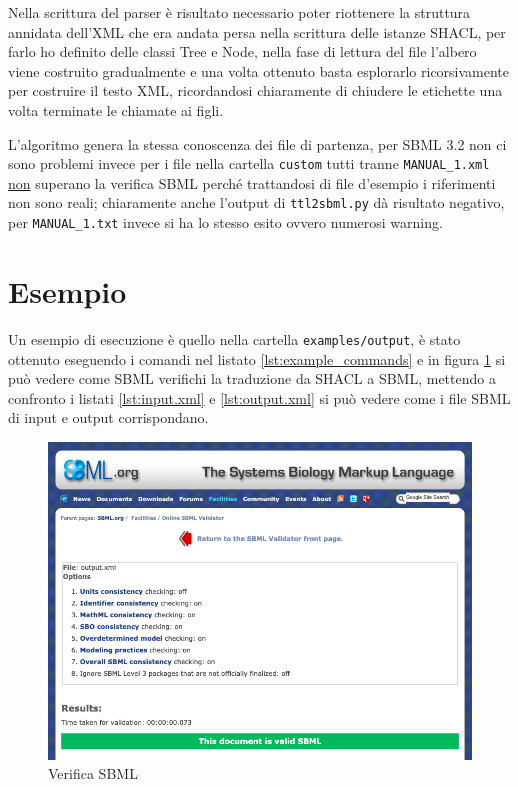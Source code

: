\documentclass{article}
\begin{document}
Nella scrittura del parser è risultato necessario poter riottenere la struttura annidata dell'XML che era andata persa nella scrittura delle istanze SHACL, per farlo ho definito delle classi Tree e Node, nella fase di lettura del file l'albero viene costruito gradualmente e una volta ottenuto basta esplorarlo ricorsivamente per costruire il testo XML, ricordandosi chiaramente di chiudere le etichette una volta terminate le chiamate ai figli. 

L'algoritmo genera la stessa conoscenza dei file di partenza, per SBML 3.2 non ci sono problemi invece per i file nella cartella \texttt{custom} tutti tranne \texttt{MANUAL\_1.xml} \underline{non} superano la verifica SBML perché trattandosi di file d'esempio i riferimenti non sono reali; chiaramente anche l'output di \texttt{ttl2sbml.py} dà risultato negativo, per \texttt{MANUAL\_1.txt} invece si ha lo stesso esito ovvero numerosi warning.

\clearpage
\section{Esempio}
Un esempio di esecuzione è quello nella cartella \texttt{examples/output}, è stato ottenuto eseguendo i comandi nel listato \ref{lst:example_commands} e in figura \ref{fig:example_validation} si può vedere come SBML verifichi la traduzione da SHACL a SBML, mettendo a confronto i listati \ref{lst:input.xml} e \ref{lst:output.xml} si può vedere come i file SBML di input e output corrispondano.



\begin{figure}[H]
    \caption{Verifica SBML}
    \label{fig:example_validation}
    \includegraphics[scale=0.43]{images/example_validation.png}
\end{figure}
\end{document}
